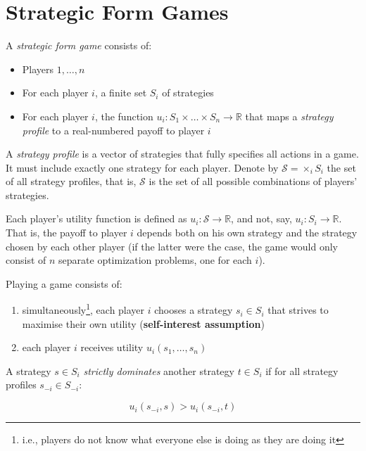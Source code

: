 \section{Strategic Form Games}

\begin{definition}
	A \textit{strategic form game} consists of:
	\begin{itemize}
		\itemsep0em
		\item Players ${1, \ldots, n}$
		\item For each player $i$, a finite set $S_i$ of strategies
		\item For each player $i$, the function $u_i : S_1 \times \ldots \times
			S_n \rightarrow \mathbb{R}$ that maps a \textit{strategy profile}
			to a real-numbered payoff to player $i$
	\end{itemize}
\end{definition}

A \textit{strategy profile} is a vector of strategies that fully specifies all
actions in a game. It must include exactly one strategy for each player. Denote
by $\mathcal{S} = \times_i S_i$ the set of all strategy profiles, that is,
$\mathcal{S}$ is the set of all possible combinations of players' strategies.

\begin{remark}
	Each player's utility function is defined as $u_i : \mathcal{S} \rightarrow
	\mathbb{R}$, and not, say, $u_i : S_i \rightarrow \mathbb{R}$.  That is,
	the payoff to player $i$ depends both on his own strategy and the strategy
	chosen by each other player (if the latter were the case, the game would
	only consist of $n$ separate optimization problems, one for each $i$).
\end{remark}

Playing a game consists of:

\begin{enumerate}
	\itemsep0em
	\item simultaneously\footnote{i.e., players do not know what everyone else
		is doing as they are doing it}, each player $i$ chooses a strategy $s_i
		\in S_i$ that strives to maximise their own utility
		(\textbf{self-interest assumption})
	\item each player $i$ receives utility $u_i(s_1, \ldots, s_n)$
\end{enumerate}

\begin{definition}
	A strategy $s \in S_i$ \textit{strictly dominates} another strategy $t \in
	S_i$ if for all strategy profiles $s_{-i} \in S_{-i}$:

	\begin{equation}
		u_i(s_{-i}, s) > u_i(s_{-i}, t)
	\end{equation}
\end{definition}

